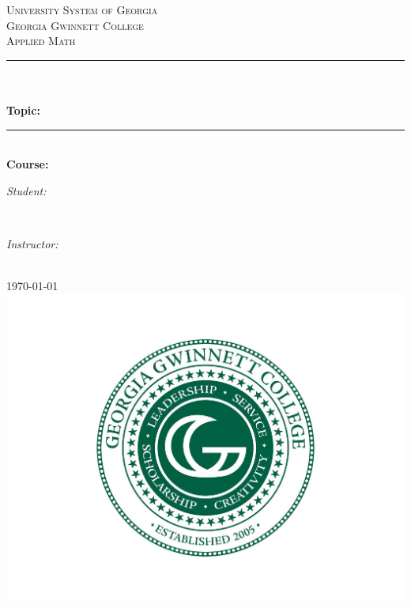 \begin{titlepage}
\newcommand{\HRule}{\rule{\linewidth}{0.5mm}}
\centering

\textsc{\LARGE University System of Georgia}\\[1.5cm]
\textsc{\Large Georgia Gwinnett College}\\[0.5cm]
\textsc{\large Applied Math}\\[0.5cm]


\HRule \\[0.4cm]
{ 
\huge{\bfseries{\reporttitle}}\\[0.5cm]
\large{\bfseries{Topic: \reportname}}
}\\[0.4cm]
\HRule \\[0.5cm]

\textbf{\large Course: \coursename}\\[0.5cm]

\begin{minipage}[t]{0.4\textwidth}
\begin{flushleft} \large
\emph{Student:}\\
\studentname
\end{flushleft}
\end{minipage}
~
\begin{minipage}[t]{0.4\textwidth}
\begin{flushright} \large
\emph{Instructor:} \\
\teachername
\end{flushright}
\end{minipage}\\[1.5cm]

{\large \today}\\[1cm]

\includegraphics[scale=.25]{Image/GGCLogo.jpg}\\[1cm] 

\vfill
\end{titlepage}
